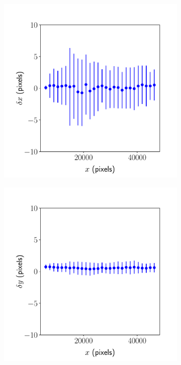 \documentclass{article}
\begin{document}
\begin{figure}[ht]
	\centering
	\begin{subfigure}{0.24\linewidth}
		\includegraphics[width=\linewidth]{sine-wave-2-xx-BMS.pdf}
		\caption{}
		\label{fig:sinewave2xxBMS}
	\end{subfigure}
	\begin{subfigure}{0.24\linewidth}
		\includegraphics[width=\linewidth]{sine-wave-2-yx-BMS.pdf}

\end{subfigure}
\end{figure}
\end{document}
